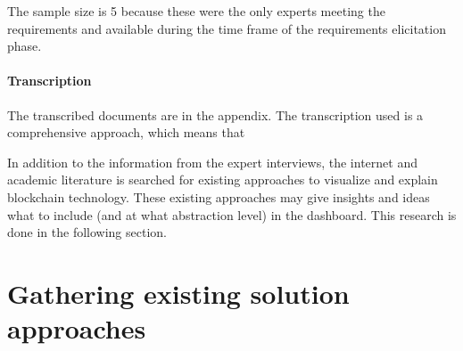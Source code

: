 The sample size is 5 because these were the only experts meeting the requirements and available during the time frame of the requirements elicitation phase.

\paragraph{Transcription} The transcribed documents are in the appendix. The transcription used is a comprehensive approach, which means that 

In addition to the information from the expert interviews, the internet and academic literature is searched for existing approaches to visualize and explain blockchain technology. These existing approaches may give insights and ideas what to include (and at what abstraction level) in the dashboard. This research is done in the following section.

\section{Gathering existing solution approaches}